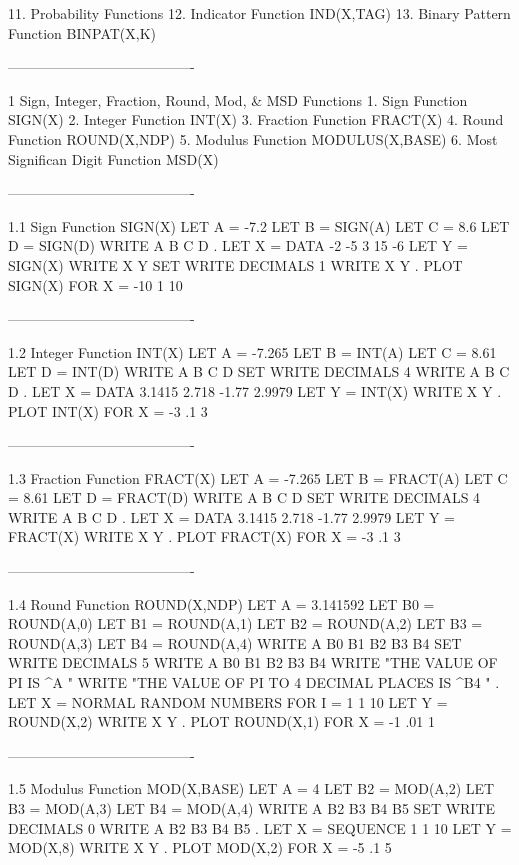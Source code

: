   11. Probability Functions
  12. Indicator Function IND(X,TAG)
  13. Binary Pattern Function BINPAT(X,K)
 
----------------------------------------
 
1
Sign, Integer, Fraction, Round, Mod, & MSD Functions
   1. Sign Function SIGN(X)
   2. Integer Function INT(X)
   3. Fraction Function FRACT(X)
   4. Round Function ROUND(X,NDP)
   5. Modulus Function MODULUS(X,BASE)
   6. Most Significan Digit Function MSD(X)
 
----------------------------------------
 
1.1
Sign Function SIGN(X)
      LET A = -7.2
      LET B = SIGN(A)
      LET C = 8.6
      LET D = SIGN(D)
      WRITE A B C D
      .
      LET X = DATA -2 -5 3 15 -6
      LET Y = SIGN(X)
      WRITE X Y
      SET WRITE DECIMALS 1
      WRITE X Y
      .
      PLOT SIGN(X) FOR X = -10 1 10
 
----------------------------------------
 
1.2
Integer Function INT(X)
      LET A = -7.265
      LET B = INT(A)
      LET C = 8.61
      LET D = INT(D)
      WRITE A B C D
      SET WRITE DECIMALS 4
      WRITE A B C D
      .
      LET X = DATA 3.1415 2.718 -1.77 2.9979
      LET Y = INT(X)
      WRITE X Y
      .
      PLOT INT(X) FOR X = -3 .1 3
 
----------------------------------------
 
1.3
Fraction Function FRACT(X)
      LET A = -7.265
      LET B = FRACT(A)
      LET C = 8.61
      LET D = FRACT(D)
      WRITE A B C D
      SET WRITE DECIMALS 4
      WRITE A B C D
      .
      LET X = DATA 3.1415 2.718 -1.77 2.9979
      LET Y = FRACT(X)
      WRITE X Y
      .
      PLOT FRACT(X) FOR X = -3 .1 3
 
----------------------------------------
 
1.4
Round Function ROUND(X,NDP)
      LET A = 3.141592
      LET B0 = ROUND(A,0)
      LET B1 = ROUND(A,1)
      LET B2 = ROUND(A,2)
      LET B3 = ROUND(A,3)
      LET B4 = ROUND(A,4)
      WRITE A B0 B1 B2 B3 B4
      SET WRITE DECIMALS 5
      WRITE A B0 B1 B2 B3 B4
      WRITE "THE VALUE OF PI IS ^A "
      WRITE "THE VALUE OF PI TO 4 DECIMAL PLACES IS ^B4 "
      .
      LET X = NORMAL RANDOM NUMBERS FOR I = 1 1 10
      LET Y = ROUND(X,2)
      WRITE X Y
      .
      PLOT ROUND(X,1) FOR X = -1 .01 1
 
----------------------------------------
 
1.5
Modulus Function MOD(X,BASE)
      LET A = 4
      LET B2 = MOD(A,2)
      LET B3 = MOD(A,3)
      LET B4 = MOD(A,4)
      WRITE A B2 B3 B4 B5
      SET WRITE DECIMALS 0
      WRITE A B2 B3 B4 B5
      .
      LET X = SEQUENCE 1 1 10
      LET Y = MOD(X,8)
      WRITE X Y
      .
      PLOT MOD(X,2) FOR X = -5 .1 5
 
